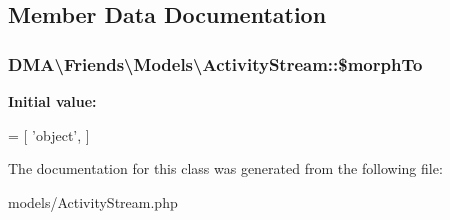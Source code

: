 

\subsection{Member Data Documentation}
\hypertarget{classDMA_1_1Friends_1_1Models_1_1ActivityStream_aaf821c5d74ad84ec4c4a98d4bb861e74}{
\subsubsection[{\$morph\-To}]{\setlength{\rightskip}{0pt plus 5cm}D\-M\-A\textbackslash{}\-Friends\textbackslash{}\-Models\textbackslash{}\-Activity\-Stream\-::\$morph\-To}}\label{classDMA_1_1Friends_1_1Models_1_1ActivityStream_aaf821c5d74ad84ec4c4a98d4bb861e74}
{\bfseries Initial value\-:}
\begin{DoxyCode}
= [
        \textcolor{stringliteral}{'object'},
    ]
\end{DoxyCode}


The documentation for this class was generated from the following file\-:\begin{DoxyCompactItemize}
\item 
models/Activity\-Stream.\-php\end{DoxyCompactItemize}
